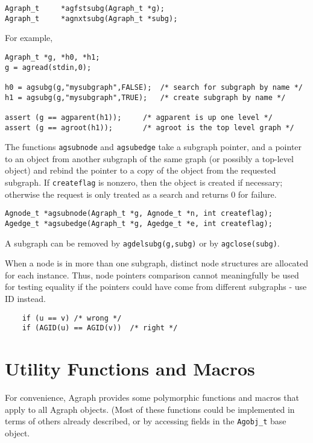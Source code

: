 \documentclass[11pt,letterpaper]{article}
\begin{document}
\begin{verbatim}
Agraph_t     *agfstsubg(Agraph_t *g);
Agraph_t     *agnxtsubg(Agraph_t *subg);
\end{verbatim}

For example,
\begin{verbatim}
Agraph_t *g, *h0, *h1;
g = agread(stdin,0);

h0 = agsubg(g,"mysubgraph",FALSE);  /* search for subgraph by name */
h1 = agsubg(g,"mysubgraph",TRUE);   /* create subgraph by name */

assert (g == agparent(h1));     /* agparent is up one level */
assert (g == agroot(h1));       /* agroot is the top level graph */

\end{verbatim}

The functions \verb"agsubnode" and \verb"agsubedge" take a subgraph
pointer, and a pointer to an object from another subgraph of the same
graph (or possibly a top-level object) and rebind the pointer to a
copy of the object from the requested subgraph.  If \verb"createflag"
is nonzero, then the object is created if necessary; otherwise the
request is only treated as a search and returns 0 for failure.

\begin{verbatim}
Agnode_t *agsubnode(Agraph_t *g, Agnode_t *n, int createflag);
Agedge_t *agsubedge(Agraph_t *g, Agedge_t *e, int createflag);
\end{verbatim}

A subgraph can be removed by \verb"agdelsubg(g,subg)" or by
\verb"agclose(subg)".

When a node is in more than one subgraph, distinct node structures
are allocated for each instance.  Thus, node pointers comparison cannot 
meaningfully be used for testing equality if the pointers could have
come from different subgraphs - use ID instead.

\begin{verbatim}
    if (u == v) /* wrong */
    if (AGID(u) == AGID(v))  /* right */
\end{verbatim}

\section{Utility Functions and Macros}
\label{sec:utilityfunctionsandmacros}

For convenience, Agraph provides some polymorphic functions and macros
that apply to all Agraph objects.   (Most of these functions could
be implemented in terms of others already described, or by accessing
fields in the \verb"Agobj_t" base object.
\end{document}

